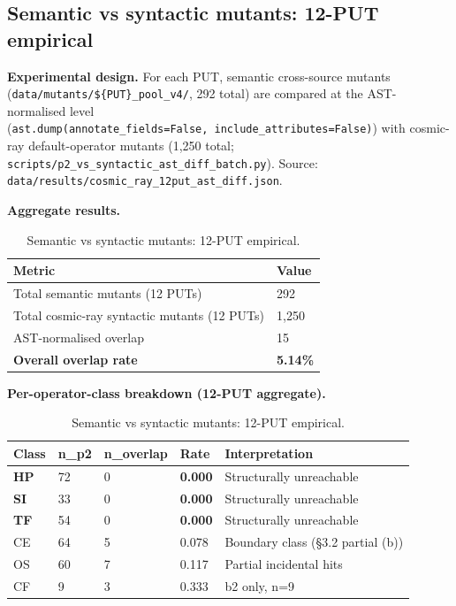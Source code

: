 \documentclass[acmsmall,screen,review]{acmart}
\begin{document}
\subsection{Semantic vs syntactic mutants: 12-PUT empirical}\label{p2-vs-syntactic-mutants-12-put-empirical-layer-3}

\textbf{Experimental design.} For each PUT, semantic cross-source mutants
(\texttt{data/mutants/\$\{PUT\}\_pool\_v4/}, 292 total) are compared at
the AST-normalised level
(\texttt{ast.dump(annotate\_fields=False,\ include\_attributes=False)})
with cosmic-ray default-operator mutants (1,250 total;
\texttt{scripts/p2\_vs\_syntactic\_ast\_diff\_batch.py}). Source:
\texttt{data/results/cosmic\_ray\_12put\_ast\_diff.json}.

\textbf{Aggregate results.}

{\def\LTcaptype{table} %
\begin{longtable}[]{@{}ll@{}}
\caption{Semantic vs syntactic mutants: 12-PUT empirical.}\label{tab:p2-04}\\
\toprule\noalign{}
Metric & Value \\
\midrule\noalign{}
\endfirsthead
\endhead
\bottomrule\noalign{}
\endlastfoot
Total semantic mutants (12 PUTs) & 292 \\
Total cosmic-ray syntactic mutants (12 PUTs) & 1,250 \\
AST-normalised overlap & 15 \\
\textbf{Overall overlap rate} & \textbf{5.14\%} \\
\end{longtable}
}

\textbf{Per-operator-class breakdown (12-PUT aggregate).}

{\def\LTcaptype{table} %
\begin{longtable}[]{@{}lllll@{}}
\caption{Semantic vs syntactic mutants: 12-PUT empirical.}\label{tab:p2-05}\\
\toprule\noalign{}
Class & n\_p2 & n\_overlap & Rate & Interpretation \\
\midrule\noalign{}
\endfirsthead
\endhead
\bottomrule\noalign{}
\endlastfoot
\textbf{HP} & 72 & 0 & \textbf{0.000} & Structurally unreachable \\
\textbf{SI} & 33 & 0 & \textbf{0.000} & Structurally unreachable \\
\textbf{TF} & 54 & 0 & \textbf{0.000} & Structurally unreachable \\
CE & 64 & 5 & 0.078 & Boundary class (§3.2 partial (b)) \\
OS & 60 & 7 & 0.117 & Partial incidental hits \\
CF & 9 & 3 & 0.333 & b2 only, n=9 \\
\end{longtable}
}
\end{document}
